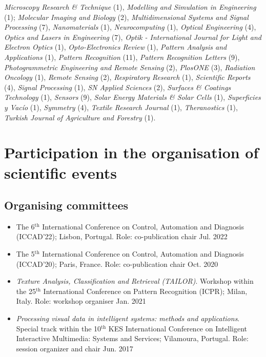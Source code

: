 \documentclass[11pt]{article}
\begin{document}
\begin{itemize}
    \emph{Microscopy Research \& Technique} (1),
		\emph{Modelling and Simulation in Engineering} (1);
    \emph{Molecular Imaging and Biology} (2),
    \emph{Multidimensional Systems and Signal Processing} (7),
    \emph{Nanomaterials} (1),
    \emph{Neurocomputing} (1),
    \emph{Optical Engineering} (4),
    \emph{Optics and Lasers in Engineering} (7),
    \emph{Optik - International Journal for Light and Electron Optics} (1),
    \emph{Opto-Electronics Review} (1),
    \emph{Pattern Analysis and Applications} (1),
    \emph{Pattern Recognition} (11),
    \emph{Pattern Recognition Letters} (9),
    \emph{Photogrammetric Engineering and Remote Sensing} (2),
    \emph{PlosONE} (3),
    \emph{Radiation Oncology} (1),
    \emph{Remote Sensing} (2),
    \emph{Respiratory Research} (1),
    \emph{Scientific Reports} (4),
    \emph{Signal Processing} (1),
    \emph{SN Applied Sciences} (2),
    \emph{Surfaces \& Coatings Technology} (1),
    \emph{Sensors} (9),
    \emph{Solar Energy Materials \& Solar Cells} (1),
    \emph{Superficies y Vacío} (1),
    \emph{Symmetry} (4),
    \emph{Textile Research Journal} (1),
    \emph{Theranostics} (1),
    \emph{Turkish Journal of Agriculture and Forestry} (1).
\end{itemize}

\section*{Participation in the organisation of scientific events}

\subsection*{Organising committees}

\begin{itemize} 

	\item The 6$^\text{th}$ International Conference on Control, Automation and Diagnosis (ICCAD'22); Lisbon, Portugal. Role: co-publication chair \hfill Jul. 2022

	\item The 5$^\text{th}$ International Conference on Control, Automation and Diagnosis (ICCAD'20); Paris, France. Role: co-publication chair \hfill Oct. 2020 

	\item \emph{Texture Analysis, Classification and Retrieval (TAILOR)}. Workshop within the 25$^\text{th}$ International Conference on Pattern Recognition (ICPR); Milan, Italy. Role: workshop organiser \hfill Jan. 2021

	\item \emph{Processing visual data in intelligent systems: methods and applications}. Special track within the 10$^\text{th}$ KES International Conference on Intelligent Interactive Multimedia: Systems and Services; Vilamoura, Portugal. Role: session organizer and chair \hfill Jun. 2017

\end{itemize}	
\end{document}
